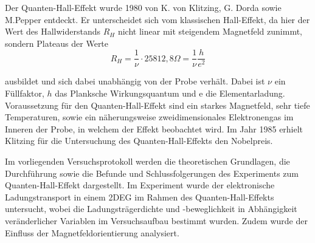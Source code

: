 

Der Quanten-Hall-Effekt wurde 1980 von K. von Klitzing, G. Dorda sowie M.Pepper entdeckt. Er unterscheidet sich vom klassischen Hall-Effekt, da hier der Wert des Hallwiderstands $R_H$ nicht linear mit steigendem Magnetfeld zunimmt, sondern Plateaus der Werte 
\begin{equation}
R_H=\frac{1}{\nu}\cdot 25812,8\Omega =\frac{1}{\nu} \frac{h}{e^2}
\label{eq:qh_plateauwerte}
\end{equation}

ausbildet und sich dabei unabhängig von der Probe verhält. Dabei ist $\nu$ ein Füllfaktor, $h$ das Planksche Wirkungsquantum und e die Elementarladung. 
Voraussetzung für den Quanten-Hall-Effekt sind ein starkes Magnetfeld, sehr tiefe Temperaturen, sowie ein näherungsweise zweidimensionales Elektronengas im Inneren der Probe, in welchem der Effekt beobachtet wird.  
Im Jahr 1985 erhielt Klitzing für die Untersuchung des Quanten-Hall-Effekts den Nobelpreis. 

Im vorliegenden Versuchsprotokoll werden die theoretischen Grundlagen, die Durchführung sowie die Befunde und Schlussfolgerungen des Experiments zum Quanten-Hall-Effekt dargestellt.
Im Experiment wurde der elektronische Ladungstransport in einem 2DEG im Rahmen des Quanten-Hall-Effekts untersucht, wobei die Ladungsträgerdichte und -beweglichkeit in Abhängigkeit veränderlicher Variablen im Versuchsaufbau bestimmt wurden. Zudem wurde der Einfluss der Magnetfeldorientierung analysiert.

